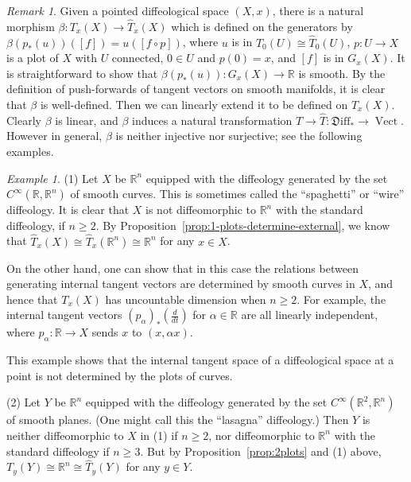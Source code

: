 \documentclass{amsart}
\theoremstyle{remark}
\newtheorem{rem}[de]{Remark}
\newtheorem{ex}[de]{Example}
\newcommand{\ra}{\to}
\DeclareMathOperator{\Vect}{Vect}
\newcommand{\Diff}{{\mathfrak{D}\mathrm{iff}}}
\def \R{\mathbb{R}}
\begin{document}
%
%
%
%
%
%
%
%
%
%
%
%
%
%
%
%
%
%
%
%
%

\begin{rem}\label{rem:comparison-map}
Given a pointed diffeological space $(X,x)$,
there is a natural morphism $\beta:T_x(X) \ra \hat{T}_x(X)$
which is defined on the generators by
$\beta(p_*(u))([f])=u([f \circ p])$,
where $u$ is in $T_0(U) \cong \hat{T}_0(U)$,
$p:U \ra X$ is a plot of $X$ with $U$ connected,
$0 \in U$ and $p(0)=x$, and $[f]$ is in $G_x(X)$.
It is straightforward to show that $\beta(p_*(u)):G_x(X) \ra \R$ is smooth.
By the definition of push-forwards of tangent vectors on smooth manifolds,
it is clear that $\beta$ is well-defined.
Then we can linearly extend it to be defined on $T_x(X)$.
Clearly $\beta$ is linear,
and $\beta$ induces a natural transformation $T \ra \hat{T}:\Diff_* \ra \Vect$.
However in general, $\beta$ is neither injective nor surjective; see the following examples.
%
\end{rem}


\begin{ex}\label{ex:wirediffeology}
(1)
Let $X$ be $\R^n$ equipped with the diffeology generated by the set
$C^\infty(\R,\R^n)$ of smooth curves.
This is sometimes called the ``spaghetti'' or ``wire'' diffeology.
It is clear that $X$ is not diffeomorphic to $\R^n$ with the standard diffeology,
if $n \geq 2$.
By Proposition~\ref{prop:1-plots-determine-external}, we know that
$\hat{T}_x(X) \cong \hat{T}_x(\R^n) \cong \R^n$ for any $x \in X$.

On the other hand, one can show that in this case the relations between
generating internal tangent vectors are determined by smooth curves in $X$,
and hence that $T_x(X)$ has uncountable dimension when $n \geq 2$.
%
%
%
For example, the internal tangent vectors $(p_{\alpha})_*(\frac{d}{dt})$
for $\alpha \in \R$ are all linearly independent, where $p_{\alpha} : \R \to X$
sends $x$ to $(x, \alpha x)$.

This example shows that the internal tangent space of
a diffeological space at a point is not determined by the plots of curves.

%
(2) Let $Y$ be $\R^n$ equipped with the diffeology generated by the set
$C^\infty(\R^2,\R^n)$ of smooth planes.
(One might call this the ``lasagna'' diffeology.)
Then $Y$ is neither diffeomorphic to $X$ in (1) if $n \geq 2$,
nor diffeomorphic to $\R^n$ with the standard diffeology if $n \geq 3$.
But by Proposition~\ref{prop:2plots} and (1) above,
$T_y(Y) \cong \R^n \cong \hat{T}_y(Y)$ for any $y \in Y$.
%
%
%
%
\end{ex}
\end{document}
